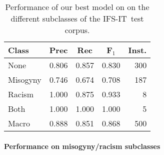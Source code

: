\documentclass[11pt]{article}
\newcommand{\dsENclassification}{IFS-EN}
\newcommand{\dsITclassification}{IFS-IT}
\newcommand{\imbert}{\mbox{Incel mBERT}}
\newcommand{\ami}{\mbox{AMI-20}}
\begin{document}
\begin{table}
    \centering
    \caption{Performance of our best model on
    on the different subclasses %
    of the \dsITclassification\, test corpus.
    }
    \label{tab:misogyny-racism-subsets-statistics}

  \begin{tabular}{lcccr}
    \hline
    \bf Class & \bf Prec & \bf Rec & \bf F$_1$ & \bf Inst. \\
    \hline
    None & 0.806 & 0.857 & 0.830 & 300 \\
    Misogyny & 0.746 & 0.674 & 0.708 & 187 \\
    Racism & 1.000 & 0.875 & 0.933 & 8 \\
    Both & 1.000 & 1.000 & 1.000 & 5 \\
    \hline
    Macro & 0.888 & 0.851 & 0.868 & 500 \\
    \hline
    \end{tabular}

\end{table}


\paragraph{Performance on misogyny/racism subclasses}
\end{document}
